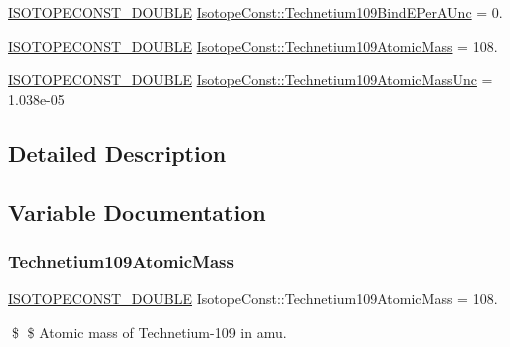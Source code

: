 \begin{DoxyCompactItemize}
\item 
\mbox{\hyperlink{group___isotope_const-_macros_ga8f45a7272ce02c0b4c65c44636ed719a}{I\+S\+O\+T\+O\+P\+E\+C\+O\+N\+S\+T\+\_\+\+D\+O\+U\+B\+LE}} \mbox{\hyperlink{group___isotope_const-_technetium-_tc109_gae9f75121a41754b9ece59ec8d6681a23}{Isotope\+Const\+::\+Technetium109\+Bind\+E\+Per\+A\+Unc}} = 0.
\item 
\mbox{\hyperlink{group___isotope_const-_macros_ga8f45a7272ce02c0b4c65c44636ed719a}{I\+S\+O\+T\+O\+P\+E\+C\+O\+N\+S\+T\+\_\+\+D\+O\+U\+B\+LE}} \mbox{\hyperlink{group___isotope_const-_technetium-_tc109_ga8f6e64f61a690a73c1e5a2776780e985}{Isotope\+Const\+::\+Technetium109\+Atomic\+Mass}} = 108.
\item 
\mbox{\hyperlink{group___isotope_const-_macros_ga8f45a7272ce02c0b4c65c44636ed719a}{I\+S\+O\+T\+O\+P\+E\+C\+O\+N\+S\+T\+\_\+\+D\+O\+U\+B\+LE}} \mbox{\hyperlink{group___isotope_const-_technetium-_tc109_gaecf79e2855c78adaa670bdb14b270dd8}{Isotope\+Const\+::\+Technetium109\+Atomic\+Mass\+Unc}} = 1.\+038e-\/05
\end{DoxyCompactItemize}


\subsection{Detailed Description}


\subsection{Variable Documentation}
\mbox{\label{group___isotope_const-_technetium-_tc109_ga8f6e64f61a690a73c1e5a2776780e985}} 
\subsubsection{\texorpdfstring{Technetium109\+Atomic\+Mass}{Technetium109AtomicMass}}
{\footnotesize\ttfamily \mbox{\hyperlink{group___isotope_const-_macros_ga8f45a7272ce02c0b4c65c44636ed719a}{I\+S\+O\+T\+O\+P\+E\+C\+O\+N\+S\+T\+\_\+\+D\+O\+U\+B\+LE}} Isotope\+Const\+::\+Technetium109\+Atomic\+Mass = 108.}

\$ \$ Atomic mass of Technetium-\/109 in amu. \mbox{\label{group___isotope_const-_technetium-_tc109_gaecf79e2855c78adaa670bdb14b270dd8}} 
